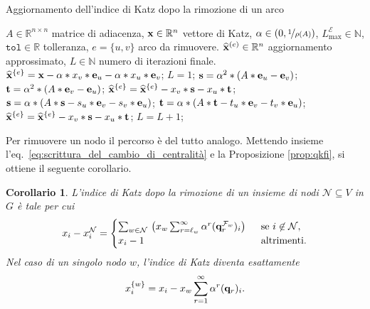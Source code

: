 \documentclass[a4paper]{article}
\newcommand{\NN}{\mathbb{N}}
\newcommand{\RR}{\mathbb{R}}
\newcommand{\evec}{{\bf e}}
\newcommand{\qvec}{{\bf q}}
\newcommand{\xvec}{{\bf x}}
\newcommand{\cE}{\mathcal{E}}
\newcommand{\cN}{\mathcal{N}}
\newcommand{\cF}{\mathcal{F}}
\newcommand{\se}{\text{se }}
\newcommand{\altrimenti}{\text{altrimenti}}
\newtheorem{corollary}{Corollario}
\begin{document}
	\begin{algorithm}[H]
		\caption{Aggiornamento dell'indice di Katz dopo la rimozione di un arco}
		\label{alg:arco}
		\begin{algorithmic}[1]
			\REQUIRE $A\in \RR^{n
				\times n}$ matrice di adiacenza, $\xvec\in \RR^{n}$ vettore di Katz, $\alpha \in (0, \nicefrac{1}{\rho(A)})$, $L_{\max}^{\cE} \in \NN$, $\texttt{tol}\in \RR$ tolleranza, $e=\{u,v\}$ arco da rimuovere.
			\ENSURE $\widehat{\xvec}^{(e)}\in \RR^{n}$ aggiornamento approssimato, $L\in \NN$ numero di iterazioni finale. 
			\STATE $\widehat{\xvec}^{\{e\}}=\xvec  - \alpha*x_v*\evec_u - \alpha*x_u*\evec_v$;
			\STATE $L=1$; 
			\STATE $\mathbf{s} = \alpha^2*(A*\evec_u -\evec_v)$;
			\STATE $\mathbf{t} = \alpha^2*(A*\evec_v - \evec_u)$;
			\STATE $\widehat{\xvec}^{\{e\}}= \widehat{\xvec}^{\{e\}} - x_v*\mathbf{s} - x_u *\mathbf{t}$;
			\WHILE {$\|x_v*\mathbf{s} + x_u *\mathbf{t}\|\,/\,\|\xvec\|_2  >  \texttt{tol}$ \AND  $L< L_{\max}^{\cE}$}
			\STATE $\mathbf{s} = \alpha *(A*\mathbf{s} - s_u *\evec_v - s_v *\evec_u)$; \label{line:matrix_vector_product_u_alg_2}
			\STATE $\mathbf{t} = \alpha *(A*\mathbf{t} - t_u *\evec_v - t_v *\evec_u)$; \label{line:matrix_vector_product_v_alg_2}
			\STATE $\widehat{\xvec}^{\{e\}}= \widehat{\xvec}^{\{e\}} - x_v*\mathbf{s} - x_u *\mathbf{t}$; 
			\STATE $L= L+1$;
			\ENDWHILE
		\end{algorithmic}
	\end{algorithm}
	
	Per rimuovere un nodo il percorso è del tutto analogo. Mettendo insieme
	l'eq.~\eqref{eq:scrittura_del_cambio_di_centralità} e la Proposizione \ref{prop:qkfi}, si ottiene il seguente corollario.
	
	\begin{corollary}
		L'indice di Katz dopo la rimozione di un insieme di nodi $\cN \subseteq V$ in $G$ è tale per cui
		\begin{equation}
			x_i - x_i^{\cN} = 
			\begin{cases}
				\sum_{w\in \cN}\,
				\left( x_w  \sum_{r=\ell_w}^{\infty} \alpha^r
				(\qvec_r^{\cF_w})_{i}\right) & \;\; \se i\not\in\cN, \\
				x_i-1                        & \;\; \altrimenti.     
			\end{cases}
		\end{equation}
		Nel caso di un singolo nodo $w$, l'indice di Katz diventa
		esattamente
		\begin{equation} \label{eq:rimozione_nodo_finale}
			x_i^{\{w\}} = x_i - x_w \sum_{r=1}^\infty \alpha^r (\qvec_r)_i.
		\end{equation}
	\end{corollary}
	
\end{document}
